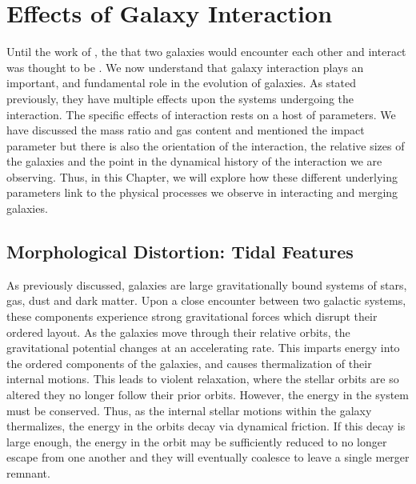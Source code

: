 \section{Effects of Galaxy Interaction}\label{sec:int_effects}
Until the work of \citet{1972ApJ...178..623T}, the \DIFdelbegin {}\DIFdelend \DIFaddbegin {}\DIFaddend that two galaxies would encounter each other and interact was thought to be \DIFdelbegin {}\DIFdelend \DIFaddbegin {}\DIFaddend . We now understand that galaxy interaction plays an important, and fundamental role in the evolution of galaxies. As stated previously, they have multiple effects upon the systems undergoing the interaction. The specific effects of interaction rests on a host of parameters. We have discussed the mass ratio and gas content and mentioned the impact parameter but there is also the orientation of the interaction, the relative sizes of the galaxies and the point in the dynamical history of the interaction we are observing. Thus, in this Chapter, we will explore how these different underlying parameters link to the physical processes we observe in interacting and merging galaxies.

\subsection{Morphological Distortion: Tidal Features}
\noindent As previously discussed, galaxies are large gravitationally bound systems of stars, gas, dust and dark matter. Upon a close encounter between two galactic systems, these components experience strong gravitational forces which disrupt their ordered layout. As the galaxies move through their relative orbits, the gravitational potential changes at an accelerating rate. This imparts energy into the ordered components of the galaxies, and causes thermalization of their internal motions. This leads to violent relaxation, where the stellar orbits are so altered they no longer follow their prior orbits. However, the energy in the system must be conserved. Thus, as the internal stellar motions within the galaxy thermalizes, the energy in the \DIFdelbegin {}\DIFdelend \DIFaddbegin {}\DIFaddend orbits decay via dynamical friction. If this decay is large enough, the energy in the \DIFdelbegin {}\DIFdelend \DIFaddbegin {}\DIFaddend orbit may be sufficiently reduced to no longer escape from one another and they will eventually coalesce to leave a single merger remnant. 

